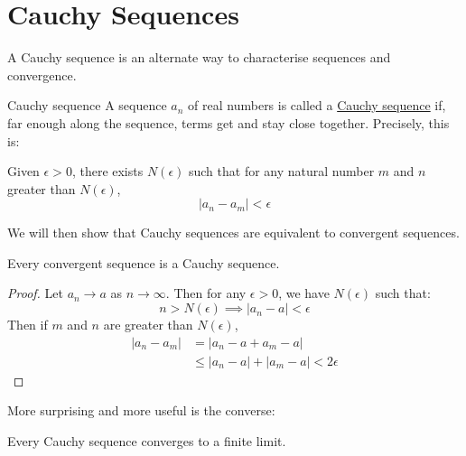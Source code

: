 \documentclass[../Main.tex]{subfiles}
\begin{document}
\section{Cauchy Sequences}
A Cauchy sequence is an alternate way to characterise sequences and convergence.
\begin{definition}{Cauchy sequence}
    A sequence $a_n$ of real numbers is called a \underline{Cauchy sequence} if, far enough along the sequence, terms get and stay close together. Precisely, this is:\par
    Given $\epsilon > 0$, there exists $N(\epsilon)$ such that for any natural number $m$ and $n$ greater than $N(\epsilon)$,
    \begin{equation*}
        |a_n - a_m| < \epsilon
    \end{equation*}
\end{definition}
We will then show that Cauchy sequences are equivalent to convergent sequences.
\begin{lemma}
    Every convergent sequence is a Cauchy sequence.
    \label{lemConvergeImpliesCauchy}
\end{lemma}
\begin{proof}
    Let $a_n \to a$ as $n \to \infty$. Then for any $\epsilon > 0$, we have $N(\epsilon)$ such that:
    \begin{equation*}
        n > N(\epsilon) \implies |a_n - a| < \epsilon
    \end{equation*}
    Then if $m$ and $n$ are greater than $N(\epsilon)$,
    \begin{align*}
        |a_n - a_m| &= |a_n - a + a_m - a| \\
        &\leq |a_n - a| + |a_m - a| < 2\epsilon
    \end{align*}
\end{proof}
More surprising and more useful is the converse:
\begin{theorem}
    Every Cauchy sequence converges to a finite limit.
    \label{thmCauchyImpliesConverge}
\end{theorem}
\end{document}
